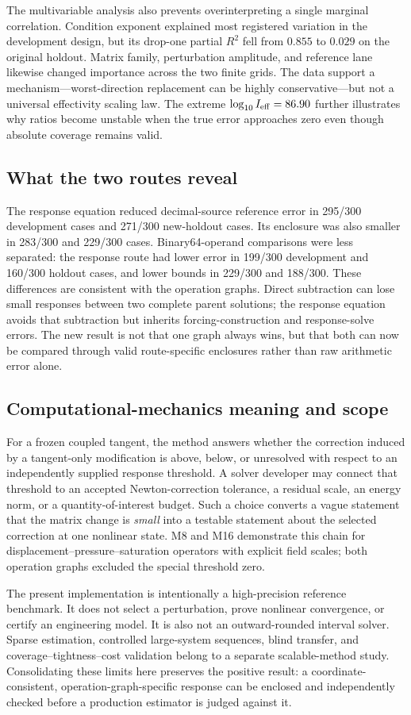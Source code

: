 The multivariable analysis also prevents overinterpreting a single marginal
correlation. Condition exponent explained most registered variation in the
development design, but its drop-one partial $R^2$ fell from $0.855$ to
$0.029$ on the original holdout. Matrix family, perturbation amplitude, and
reference lane likewise changed importance across the two finite grids. The
data support a mechanism---worst-direction replacement can be highly
conservative---but not a universal effectivity scaling law. The extreme
$\log_{10}I_{\rm eff}=86.90$ further illustrates why ratios become
unstable when the true error approaches zero even though absolute coverage
remains valid.

\subsection{What the two routes reveal}

The response equation reduced decimal-source reference error in 295/300
development cases and 271/300 new-holdout cases. Its enclosure was also
smaller in 283/300 and 229/300 cases. Binary64-operand comparisons were less
separated: the response route had lower error in 199/300 development and
160/300 holdout cases, and lower bounds in 229/300 and 188/300. These
differences are consistent with the operation graphs. Direct subtraction can
lose small responses between two complete parent solutions; the response
equation avoids that subtraction but inherits forcing-construction and
response-solve errors. The new result is not that one graph always wins, but
that both can now be compared through valid route-specific enclosures rather
than raw arithmetic error alone.

\subsection{Computational-mechanics meaning and scope}

For a frozen coupled tangent, the method answers whether the correction
induced by a tangent-only modification is above, below, or unresolved with
respect to an independently supplied response threshold. A solver developer
may connect that threshold to an accepted Newton-correction tolerance, a
residual scale, an energy norm, or a quantity-of-interest budget. Such a
choice converts a vague statement that the matrix change is \emph{small}
into a testable statement about the selected correction at one nonlinear
state. M8 and M16 demonstrate this chain for
displacement--pressure--saturation operators with explicit field scales; both
operation graphs excluded the special threshold zero.

The present implementation is intentionally a high-precision reference
benchmark. It does not select a perturbation, prove nonlinear convergence,
or certify an engineering model. It is also not an outward-rounded interval
solver. Sparse estimation, controlled large-system sequences, blind transfer,
and coverage--tightness--cost validation belong to a separate scalable-method
study. Consolidating these limits here preserves the positive result: a
coordinate-consistent, operation-graph-specific response can be enclosed and
independently checked before a production estimator is judged against it.
